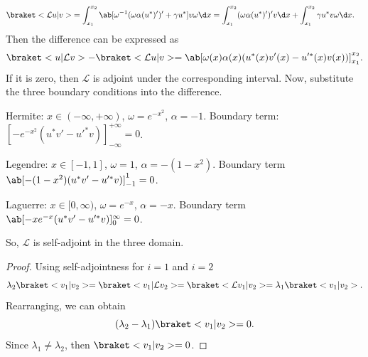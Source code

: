 \begin{solution}
\begin{enumext}
\begin{align*}
      \braket<\mathcal Lu|v> & = \int_{x_1}^{x_2}
      \ab[\omega^{-1} (\omega \alpha (u^*)' )' + \gamma u^*] v \omega \d x
    = \int_{x_1}^{x_2} (\omega \alpha (u^*)')' v \d x
    + \int_{x_1}^{x_2} \gamma u^* v \omega \d x.
    \end{align*}
    Then the difference can be expressed as
    \[
      \braket<u|\mathcal Lv> - \braket<\mathcal Lu|v>
    = \ab[\omega(x) \alpha(x) (u^*(x) v'(x) - u'^*(x) v(x))]_{x_1}^{x_2}.
    \]
    If it is zero, then $\mathcal L$ is adjoint under the corresponding interval.
    Now, substitute the three boundary conditions into the difference.
    \begin{enumext}
      \item Hermite: $x \in (-\infty, +\infty)$, $\omega = e^{-x^2}$, $\alpha = -1$.
      Boundary term: $[-e^{-x^2} (u^* v' - u'^* v)]_{-\infty}^{+\infty} = 0$.
      \item Legendre: $x \in [-1, 1]$, $\omega = 1$, $\alpha = -(1 - x^2)$.
      Boundary term $\ab[-(1 - x^2) (u^* v' - u'^* v)]_{-1}^1 = 0$.
      \item Laguerre: $x \in [0, \infty)$, $\omega = e^{-x}$, $\alpha = -x$.
      Boundary term $\ab[-x e^{-x} (u^* v' - u'^* v)]_0^{\infty} = 0$.
    \end{enumext}
    So, $\mathcal L$ is self-adjoint in the three domain.
    \item \begin{proof}
    Using self-adjointness for $i = 1$ and $i = 2$
    \[
      \lambda_2 \braket<v_1|v_2> = \braket<v_1|\mathcal L v_2>
    = \braket<\mathcal L v_1|v_2> = \lambda_1 \braket<v_1|v_2>.
    \]
    Rearranging, we can obtain
    \[
      (\lambda_2 - \lambda_1) \braket<v_1 | v_2> = 0.
    \]
    Since $\lambda_1 \neq \lambda_2$, then $\braket<v_1|v_2> = 0$.
    \end{proof}
  \end{enumext}
\end{solution}

\newpage

